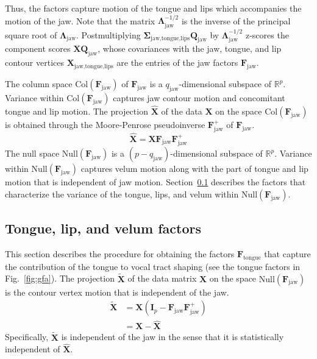 \documentclass[preprint]{JASAnew}\usepackage[]{graphicx}\usepackage[]{color}
\begin{document}
%
Thus, the factors capture motion of the tongue and lips which accompanies the motion of the jaw. 
%
Note that the matrix $\boldsymbol{\Lambda}_\text{jaw}^{-1/2}$ is the inverse of the principal square root of $\boldsymbol{\Lambda}_\text{jaw}$.
%
Postmultiplying $\boldsymbol{\Sigma}_\text{jaw,tongue,lips} \mathbf{Q}_\text{jaw}$ by $\boldsymbol{\Lambda}_\text{jaw}^{-1/2}$ z-scores the component scores $\mathbf{X}\mathbf{Q}_\text{jaw}$, whose covariances with the jaw, tongue, and lip contour vertices $\mathbf{X}_\text{jaw,tongue,lips}$ are the entries of the jaw factors $\mathbf{F}_\text{jaw}$.

The column space $\mathrm{Col}(\mathbf{F}_\text{jaw})$ of $\mathbf{F}_\text{jaw}$ is a $q_\text{jaw}$-dimensional subspace of $\mathbb{R}^p$. 
%
Variance within $\mathrm{Col}(\mathbf{F}_\text{jaw})$ captures jaw contour motion and concomitant tongue and lip motion. 
%
The projection $\mathbf{\hat{X}}$ of the data $\mathbf{X}$ on the space $\mathrm{Col}(\mathbf{F}_\text{jaw})$ is obtained through the Moore-Penrose pseudoinverse $\mathbf{F}_\text{jaw}^+$ of $\mathbf{F}_\text{jaw}$. 
%
\begin{equation} \label{eq:XXuu}
\mathbf{\hat{X}} 
= \mathbf{X} 
  \mathbf{F}_\text{jaw}
  \mathbf{F}_\text{jaw}^+ 
\end{equation}
%
The null space $\mathrm{Null}(\mathbf{F}_\text{jaw})$ is a $(p-q_\text{jaw})$-dimensional subspace of $\mathbb{R}^p$. 
% 
Variance within $\mathrm{Null}(\mathbf{F}_\text{jaw})$ captures velum motion along with the part of tongue and lip motion that is independent of jaw motion. 
%
Section~\ref{subsec:residfactors} describes the factors that characterize the variance of the tongue, lips, and velum within $\mathrm{Null} \left( \mathbf{F}_\text{jaw} \right)$. 





\subsection{Tongue, lip, and velum factors}
\label{subsec:residfactors}

This section describes the procedure for obtaining the factors $\mathbf{F}_\text{tongue}$ that capture the contribution of the tongue to vocal tract shaping  (see the tongue factors in Fig.~\ref{fig:gfa}). 
% 
The projection $\mathbf{\tilde{X}}$ of the data matrix $\mathbf{X}$ on the space $\mathrm{Null}(\mathbf{F}_\text{jaw})$ is the contour vertex motion that is independent of the jaw.
%
\begin{align} \label{eq:XXX}
\mathbf{\tilde{X}} 
&= \mathbf{X} \left( \mathbf{I}_p - \mathbf{F}_\text{jaw}\mathbf{F}_\text{jaw}^+ \right) \\
&= \mathbf{X} - \mathbf{\hat{X}} 
\end{align}
%
Specifically, $\mathbf{\tilde{X}}$ is independent of the jaw in the sense that it is statistically independent of $\mathbf{\hat{X}}$. 
%
\end{document}
